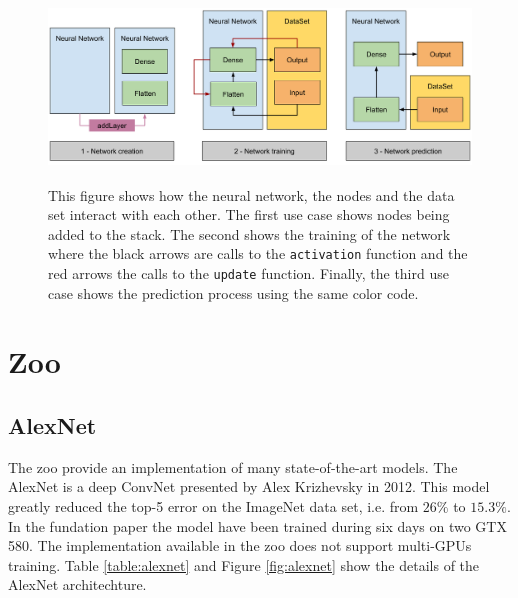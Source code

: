 \documentclass[11pt]{report}
\begin{document}
\begin{figure}[h]
\centering
\includegraphics[width=15cm, height=5cm]{neural_network}
\caption[Interactions between neural network, nodes and data set]{This figure shows how the neural network, the nodes and the data set interact with each other. The first use case shows nodes being added to the stack. The second shows the training of the network where the black arrows are calls to the \texttt{activation} function and the red arrows the calls to the \texttt{update} function. Finally, the third use case shows the prediction process using the same color code.}
\end{figure}
\newpage

\section{Zoo}

\subsection{AlexNet}

The zoo provide an implementation of many state-of-the-art models. The AlexNet is a deep ConvNet presented by Alex Krizhevsky in 2012. This 
model greatly reduced the top-5 error on the ImageNet data set, i.e. from $26\%$ to $15.3\%$. In the fundation paper the model have been trained during six days on two GTX 580. The implementation available in the zoo does not support multi-GPUs training. Table \ref{table:alexnet} and Figure \ref{fig:alexnet} show the details of the AlexNet architechture. 
\end{document}
